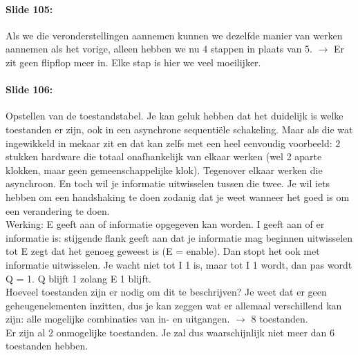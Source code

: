 \documentclass[10pt,a4paper]{book}
\begin{document}
\paragraph{Slide 105:} Als we die veronderstellingen aannemen kunnen we dezelfde manier van werken aannemen als het vorige, alleen hebben we nu 4 stappen in plaats van 5. $\rightarrow$ Er zit geen flipflop meer in. Elke stap is hier we veel moeilijker.

\paragraph{Slide 106:} Opstellen van de toestandstabel. Je kan geluk hebben dat het duidelijk is welke toestanden er zijn, ook in een asynchrone sequenti\"ele schakeling. Maar als die wat ingewikkeld in mekaar zit en dat kan zelfs met een heel eenvoudig voorbeeld: 2 stukken hardware die totaal onafhankelijk van elkaar werken (wel 2 aparte klokken, maar geen gemeenschappelijke klok). Tegenover elkaar werken die asynchroon. En toch wil je informatie uitwisselen tussen die twee. Je wil iets hebben om een handshaking te doen zodanig dat je weet wanneer het goed is om een verandering te doen.\\
Werking: E geeft aan of informatie opgegeven kan worden. I geeft aan of er informatie is: stijgende flank geeft aan dat je informatie mag beginnen uitwisselen tot E zegt dat het genoeg geweest is (E = enable). Dan stopt het ook met informatie uitwisselen. Je wacht niet tot I 1 is, maar tot I 1 wordt, dan pas wordt Q = 1. Q blijft 1 zolang E 1 blijft.\\
Hoeveel toestanden zijn er nodig om dit te beschrijven? Je weet dat er geen geheugenelementen inzitten, dus je kan zeggen wat er allemaal verschillend kan zijn: alle mogelijke combinaties van in- en uitgangen. $\rightarrow$ 8 toestanden.\\
Er zijn al 2 onmogelijke toestanden. Je zal dus waarschijnlijk niet meer dan 6 toestanden hebben.
\end{document}
